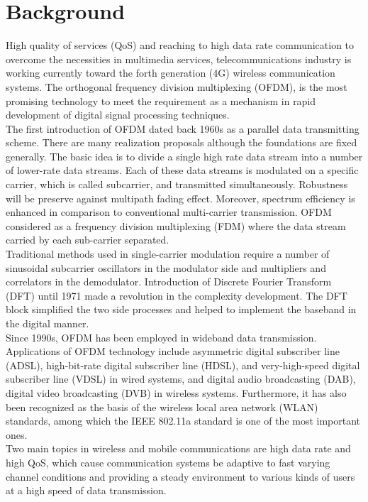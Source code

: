 \section{Background}


High quality of services (QoS) and reaching to high data rate communication to overcome the necessities in multimedia services, telecommunications industry is working currently toward the forth generation (4G) wireless communication systems. The orthogonal frequency division multiplexing (OFDM), is the most promising technology to meet the requirement as a mechanism in rapid development of digital signal processing techniques.\\

The first introduction of OFDM dated back 1960s as a parallel data transmitting scheme. There are many realization proposals although the foundations are fixed generally. The basic idea is to divide a single high rate data stream into a number of lower-rate data 
streams. Each of these data streams is modulated on a specific carrier, which is called 
subcarrier, and transmitted simultaneously. Robustness will be preserve against multipath fading effect. Moreover, spectrum efficiency is enhanced in comparison to conventional multi-carrier transmission. OFDM considered as a frequency division multiplexing (FDM) where the data stream carried by each sub-carrier separated.\\

Traditional methods used in single-carrier modulation require a number of sinusoidal subcarrier oscillators in the modulator side and multipliers and correlators in the demodulator. Introduction of Discrete Fourier Transform (DFT) until 1971 made a revolution in the complexity development. The DFT block simplified the two side processes and helped to implement the baseband in the digital manner.\\
Since 1990s, OFDM has been employed in wideband data transmission. Applications of OFDM technology include asymmetric digital subscriber line (ADSL), high-bit-rate digital subscriber line (HDSL), and very-high-speed digital subscriber line (VDSL) in wired systems, and digital audio broadcasting (DAB), digital video broadcasting (DVB) in wireless systems. Furthermore, it has also been recognized as the basis of the wireless local area network (WLAN) standards, among which the IEEE 802.11a standard is one of the most important ones.\\

Two main topics in wireless and mobile communications are high data rate and high QoS, which cause communication systems be adaptive to fast varying channel conditions and providing a steady environment to various kinds of users at a high speed of data transmission.\\

